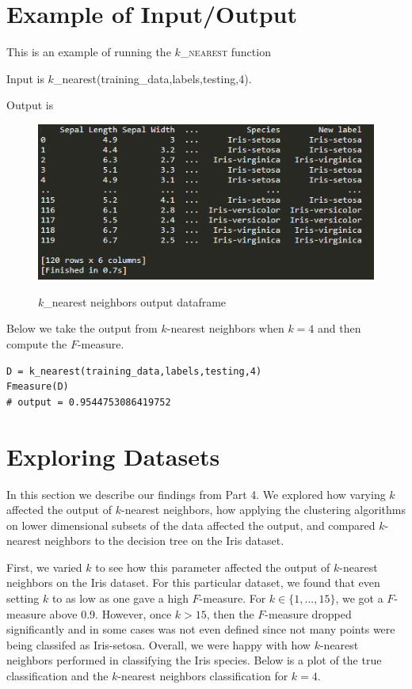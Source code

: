 \documentclass[psamsfonts,onesided,10pt]{amsart}
\begin{document}
\section{Example of Input/Output}
\begin{description}
\item[$k$-Nearest Neighbors] This is an example of running the \textsc{$k$\_nearest} function
	\item Input is $k$\_nearest(training_data,labels,testing,4).
	\item Output is
	\begin{figure}[H]
    	\centering
    	{\includegraphics[width=.4\textwidth]{images/knearest.PNG}} 
   	 \caption{$k$\_nearest neighbors output dataframe}
\end{figure}
	

\item[Decision Tree] \todo{}

\item[$k$ Fold Cross Validation] \todo{}

\item[$F$-measure] Below we take the output from $k$-nearest neighbors when $k=4$ and then compute the $F$-measure. 
\begin{verbatim}
D = k_nearest(training_data,labels,testing,4)
Fmeasure(D)
# output = 0.9544753086419752
\end{verbatim}
\end{description}

\section{Exploring Datasets}
In this section we describe our findings from Part 4. We explored how varying $k$ affected the 
output of $k$-nearest neighbors, how applying the clustering algorithms on lower dimensional 
subsets of the data affected the output, and compared $k$-nearest neighbors to the decision 
tree on the Iris dataset. 

First, we varied $k$ to see how this parameter affected the output of $k$-nearest neighbors on 
the Iris dataset. For this particular dataset, we found that even setting $k$ to as low as one gave 
a high $F$-measure. For $k\in \{1,...,15\}$, we got a $F$-measure above 0.9. However, 
once $k>15$, then the $F$-measure dropped significantly and in some cases was not even 
defined since not many points were being classifed as Iris-setosa. Overall, we were happy with 
how $k$-nearest neighbors performed in classifying the Iris species. Below is a plot of the true 
classification and the $k$-nearest neighbors classification for $k=4$. 
\end{document}
